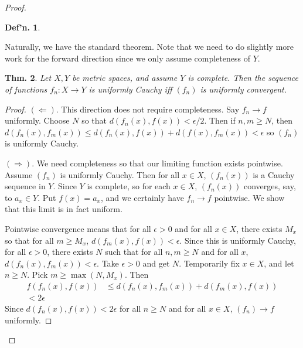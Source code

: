 \documentclass[12pt, a4paper]{book}
\newtheorem{theorem}{Thm.}[section]
\newtheorem{definition}[theorem]{Def'n.}
\theoremstyle{nonumberplain}
\newtheorem{proof}{Proof}
\begin{document}
\begin{proof}
\begin{definition}
\end{definition}
Naturally, we have the standard theorem.
Note that we need to do slightly more work for the forward direction since we only assume completeness of $Y$.
\begin{theorem}
    Let $X,Y$ be metric spaces, and assume $Y$ is complete. Then the sequence of functions $f_n:X\to Y$ is uniformly
    Cauchy iff $(f_n)$ is uniformly convergent.
\end{theorem}
\begin{proof}
    $(\Leftarrow)$.
    This direction does not require completeness.
    Say $f_n\to f$ uniformly.
    Choose $N$ so that $d(f_n(x),f(x))<\epsilon/2$.
    Then if $n,m\geq N$, then $d(f_n(x),f_m(x))\leq d(f_n(x),f(x))+d(f(x),f_m(x))<\epsilon$ so $(f_n)$ is uniformly Cauchy.

    $(\Rightarrow)$.
    We need completeness so that our limiting function exists pointwise.
    Assume $(f_n)$ is uniformly Cauchy.
    Then for all $x\in X$, $(f_n(x))$ is a Cauchy sequence in $Y$.
    Since $Y$ is complete, so for each $x\in X$, $(f_n(x))$ converges, say, to $a_x\in Y$.
    Put $f(x)=a_x$, and we certainly have $f_n\to f$ pointwise.
    We show that this limit is in fact uniform.

    Pointwise convergence means that for all $\epsilon>0$ and for all $x\in X$, there exists $M_x$ so that for all $m\geq M_x$,
    $d(f_m(x),f(x))<\epsilon$. Since this is uniformly Cauchy, for all $\epsilon>0$, there exists $N$ such that
    for all $n,m\geq N$ and for all $x$, $d(f_n(x),f_m(x))<\epsilon$. Take $\epsilon>0$ and get $N$. Temporarily fix
    $x\in X$, and let $n\geq N$. Pick $m\geq\max(N,M_x)$. Then
    \begin{align*}
        f(f_n(x),f(x)) &\leq d(f_n(x),f_m(x))+d(f_m(x),f(x))\\
        <2\epsilon
    \end{align*}
    Since $d(f_n(x),f(x))<2\epsilon$ for all $n\geq N$ and for all $x\in X$, $(f_n)\to f$ uniformly.
\end{proof}

\end{proof}
\end{document}
